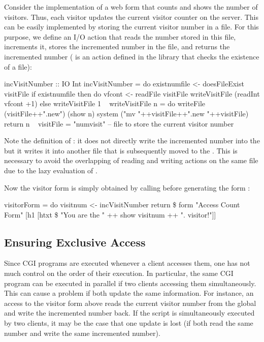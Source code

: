 Consider the implementation of a web form that counts
and shows the number of visitors. Thus, each visitor
updates the current visitor counter on the server.
This can be easily implemented by storing the current
visitor number in a file.
For this purpose, we define an I/O action 
that reads the number stored in this file, increments it,
stores the incremented number
in the file, and returns the incremented number
( is an action defined
in the library  that checks the existence of a file):
\begin{prog}
incVisitNumber :: IO Int
incVisitNumber = do
 existnumfile <- doesFileExist visitFile
 if existnumfile
   then do vfcont <- readFile visitFile
           writeVisitFile (readInt vfcont +1)
   else writeVisitFile 1
~
writeVisitFile n =\label{sec-writeVisitFile}
 do writeFile (visitFile++".new") (show n)
    system ("mv "++visitFile++".new "++visitFile)
    return n
~
visitFile = "numvisit"  -- file to store the current visitor number
\end{prog}
Note the definition of :
it does not directly write the incremented number
into the  but it writes it into another file that is
subsequently moved to the .
This is necessary to avoid the overlapping of reading and writing actions
on the same file due to the lazy evaluation of .

Now the visitor form is simply obtained by calling 
before generating the form
:
\begin{prog}
visitorForm = do
  visitnum <- incVisitNumber
  return \$ form "Access Count Form"
           [h1 [htxt \$ "You are the " ++ show visitnum ++ ". visitor!"]]
\end{prog}


\subsection{Ensuring Exclusive Access}
\label{sec-exclusiveIO}

Since CGI programs are executed whenever a client accesses them,
one has not much control on the order of their execution.
In particular, the same CGI program can be executed
in parallel if two clients accessing them simultaneously.
This can cause a problem if both update the same information.
For instance, an access to the visitor form above
reads the current visitor number from the global 
and write the incremented number back.
If the script is simultaneously executed by two clients,
it may be the case that one update is lost (if both read the same
number and write the same incremented number).

